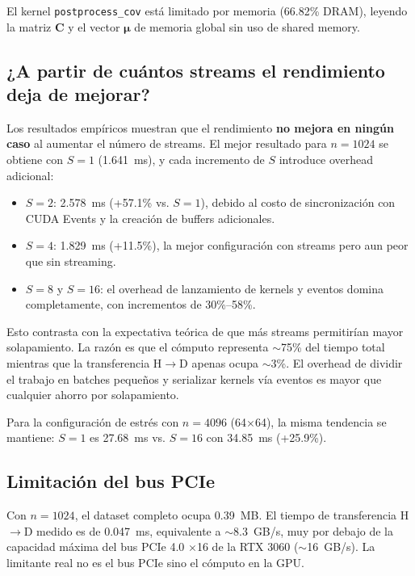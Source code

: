 \documentclass[12pt,a4paper]{article}
\begin{document}
El kernel \texttt{postprocess\_cov} está limitado por memoria (66.82\% DRAM),
leyendo la matriz $\mathbf{C}$ y el vector $\boldsymbol{\mu}$ de memoria global
sin uso de shared memory.

\subsection{¿A partir de cuántos streams el rendimiento deja de mejorar?}

Los resultados empíricos muestran que el rendimiento \textbf{no mejora en ningún
caso} al aumentar el número de streams. El mejor resultado para $n=1024$ se
obtiene con $S=1$ (1.641~ms), y cada incremento de $S$ introduce overhead adicional:

\begin{itemize}
    \item $S=2$: 2.578~ms (+57.1\% vs. $S=1$), debido al costo de sincronización
          con CUDA Events y la creación de buffers adicionales.
    \item $S=4$: 1.829~ms (+11.5\%), la mejor configuración con streams pero
          aun peor que sin streaming.
    \item $S=8$ y $S=16$: el overhead de lanzamiento de kernels y eventos domina
          completamente, con incrementos de 30\%--58\%.
\end{itemize}

Esto contrasta con la expectativa teórica de que más streams permitirían mayor
solapamiento. La razón es que el cómputo representa $\sim$75\% del tiempo total
mientras que la transferencia H$\rightarrow$D apenas ocupa $\sim$3\%. El overhead
de dividir el trabajo en batches peque\~nos y serializar kernels vía eventos es
mayor que cualquier ahorro por solapamiento.

Para la configuración de estrés con $n=4096$ (64$\times$64), la misma tendencia
se mantiene: $S=1$ es 27.68~ms vs. $S=16$ con 34.85~ms (+25.9\%).

\subsection{Limitación del bus PCIe}

Con $n=1024$, el dataset completo ocupa 0.39~MB. El tiempo de transferencia
H$\rightarrow$D medido es de 0.047~ms, equivalente a $\sim$8.3~GB/s, muy por
debajo de la capacidad máxima del bus PCIe 4.0 $\times$16 de la RTX 3060
($\sim$16~GB/s). La limitante real no es el bus PCIe sino el cómputo en la GPU.
\end{document}
